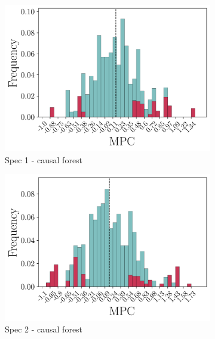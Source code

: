 \begin{figure}[t]
    \begin{subfigure}{0.33\linewidth}
        \includegraphics[width=\linewidth]{figures/distributions/spec1_cf_chSNDexp.png}
        \caption{Spec 1 - causal forest}
    \end{subfigure}\hfill
    \begin{subfigure}{0.33\linewidth}
        \includegraphics[width=\linewidth]{figures/distributions/spec2_cf_chSNDexp.png}
        \caption{Spec 2 - causal forest}
    \end{subfigure}\hfill
    \begin{subfigure}{0.33\linewidth}

\end{subfigure}
\end{figure}
